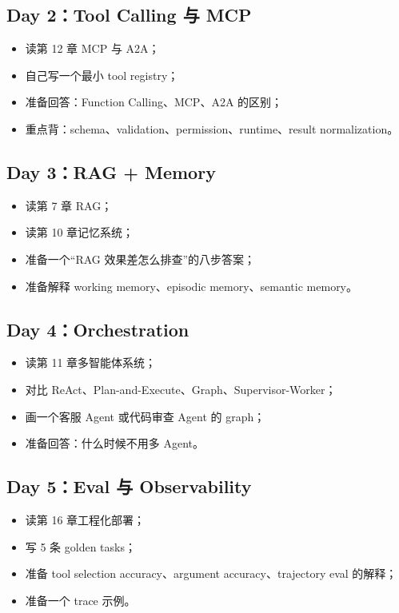 \subsection{Day 2：Tool Calling 与 MCP}

\begin{itemize}[leftmargin=2em]
\item 读第 12 章 MCP 与 A2A；
\item 自己写一个最小 tool registry；
\item 准备回答：Function Calling、MCP、A2A 的区别；
\item 重点背：schema、validation、permission、runtime、result normalization。
\end{itemize}

\subsection{Day 3：RAG + Memory}

\begin{itemize}[leftmargin=2em]
\item 读第 7 章 RAG；
\item 读第 10 章记忆系统；
\item 准备一个``RAG 效果差怎么排查''的八步答案；
\item 准备解释 working memory、episodic memory、semantic memory。
\end{itemize}

\subsection{Day 4：Orchestration}

\begin{itemize}[leftmargin=2em]
\item 读第 11 章多智能体系统；
\item 对比 ReAct、Plan-and-Execute、Graph、Supervisor-Worker；
\item 画一个客服 Agent 或代码审查 Agent 的 graph；
\item 准备回答：什么时候不用多 Agent。
\end{itemize}

\subsection{Day 5：Eval 与 Observability}

\begin{itemize}[leftmargin=2em]
\item 读第 16 章工程化部署；
\item 写 5 条 golden tasks；
\item 准备 tool selection accuracy、argument accuracy、trajectory eval 的解释；
\item 准备一个 trace 示例。
\end{itemize}

